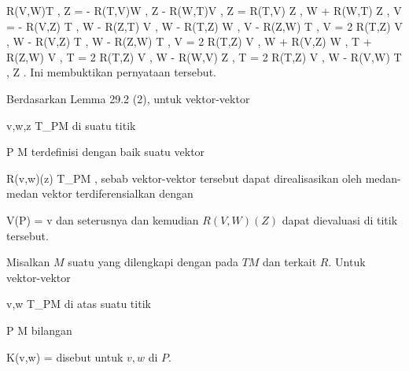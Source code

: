{{\mavergleichskettealigndrucklinks
{\vergleichskettealigndrucklinks
{ \left\langle R(V,W)T , Z  \right\rangle
}
{ =} { - \left\langle R(T,V)W , Z  \right\rangle - \left\langle R(W,T)V , Z  \right\rangle
}
{ =} { \left\langle R(T,V) Z , W  \right\rangle + \left\langle R(W,T) Z ,  V  \right\rangle
}
{ =} { - \left\langle R(V,Z) T , W  \right\rangle - \left\langle R(Z,T) V  ,  W  \right\rangle - \left\langle R(T,Z) W ,  V  \right\rangle - \left\langle R(Z,W) T ,  V  \right\rangle
}
{ =} { 2 \left\langle R(T,Z) V  ,  W  \right\rangle - \left\langle R(V,Z) T , W  \right\rangle - \left\langle R(Z,W) T ,  V  \right\rangle
}
}
{
\vergleichskettefortsetzungalign
{ =} { 2 \left\langle R(T,Z) V  ,  W  \right\rangle + \left\langle R(V,Z) W , T  \right\rangle + \left\langle R(Z,W) V  ,  T  \right\rangle
}
{ =} { 2 \left\langle R(T,Z) V  ,  W  \right\rangle - \left\langle R(W,V) Z , T  \right\rangle
}
{ =} { 2 \left\langle R(T,Z) V  ,  W  \right\rangle - \left\langle R(V,W) T , Z  \right\rangle
}
{ } {}
}{}{.}
Ini membuktikan pernyataan tersebut.
}

}

Berdasarkan
Lemma 29.2 (2),
untuk vektor-vektor

\mavergleichskette
{\vergleichskette
{ v,w,z
}
{ \in }{ T_PM
}
{  }{
}
{    }{
}
{   }{
}
}
{}{}{}
di suatu titik

\mavergleichskette
{\vergleichskette
{ P
}
{ \in }{ M
}
{  }{
}
{    }{
}
{   }{
}
}
{}{}{}
terdefinisi dengan baik suatu vektor

\mavergleichskette
{\vergleichskette
{ R(v,w)(z)
}
{ \in }{ T_PM
}
{  }{
}
{    }{
}
{   }{
}
}
{}{}{,}
sebab vektor-vektor tersebut dapat direalisasikan oleh medan-medan vektor terdiferensialkan
 dengan

\mavergleichskette
{\vergleichskette
{ V(P)
}
{ = }{ v
}
{  }{
}
{    }{
}
{   }{
}
}
{}{}{}
dan seterusnya
 {} {}
dan kemudian $R(V,W)(Z)$ dapat dievaluasi di titik tersebut.


{}
{

Misalkan $M$ suatu
yang dilengkapi dengan
pada
$TM$ dan
terkait $R$. Untuk vektor-vektor

\mavergleichskette
{\vergleichskette
{ v,w
}
{ \in }{ T_PM
}
{  }{
}
{    }{
}
{   }{
}
}
{}{}{}
di atas suatu titik

\mavergleichskette
{\vergleichskette
{ P
}
{ \in }{ M
}
{  }{
}
{    }{
}
{   }{
}
}
{}{}{}
bilangan

\mavergleichskettedisp
{\vergleichskette
{ K(v,w)
}
{ =} { {  }
}
{ } {
}
{ } {
}
{ } {
}
}
{}{}{}
disebut
untuk $v,w$ di $P$.

}

